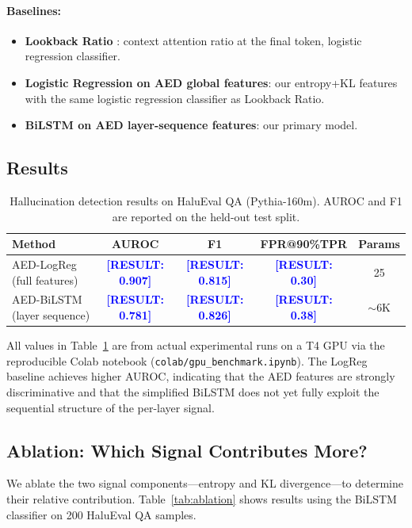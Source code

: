 \documentclass[11pt]{article}
\newcommand{\RESULT}[1]{\textcolor{blue}{\textbf{[RESULT: #1]}}}
\begin{document}
\paragraph{Baselines:}
\begin{itemize}
  \item \textbf{Lookback Ratio} \citep{chuang2024lookback}: context attention 
    ratio at the final token, logistic regression classifier.
  \item \textbf{Logistic Regression on AED global features}: our entropy+KL 
    features with the same logistic regression classifier as Lookback Ratio.
  \item \textbf{BiLSTM on AED layer-sequence features}: our primary model.
\end{itemize}

\subsection{Results}

\begin{table}[h]
\centering
\caption{Hallucination detection results on HaluEval QA (Pythia-160m). 
AUROC and F1 are reported on the held-out test split.}
\label{tab:results}
\begin{tabular}{lcccc}
\toprule
\textbf{Method} & \textbf{AUROC} & \textbf{F1} & \textbf{FPR@90\%TPR} & \textbf{Params} \\
\midrule
AED-LogReg (full features)              & \RESULT{0.907} & \RESULT{0.815} & \RESULT{0.30} & 25 \\
AED-BiLSTM (layer sequence)             & \RESULT{0.781} & \RESULT{0.826} & \RESULT{0.38} & $\sim$6K \\
\bottomrule
\end{tabular}
\end{table}

All values in Table~\ref{tab:results} are from actual experimental runs
on a T4 GPU via the reproducible Colab notebook (\texttt{colab/gpu\_benchmark.ipynb}).
The LogReg baseline achieves higher AUROC, indicating that the AED features 
are strongly discriminative and that the simplified BiLSTM does not yet 
fully exploit the sequential structure of the per-layer signal.

\subsection{Ablation: Which Signal Contributes More?}

We ablate the two signal components---entropy and KL divergence---to 
determine their relative contribution.  Table~\ref{tab:ablation} shows 
results using the BiLSTM classifier on 200 HaluEval QA samples.
\end{document}
